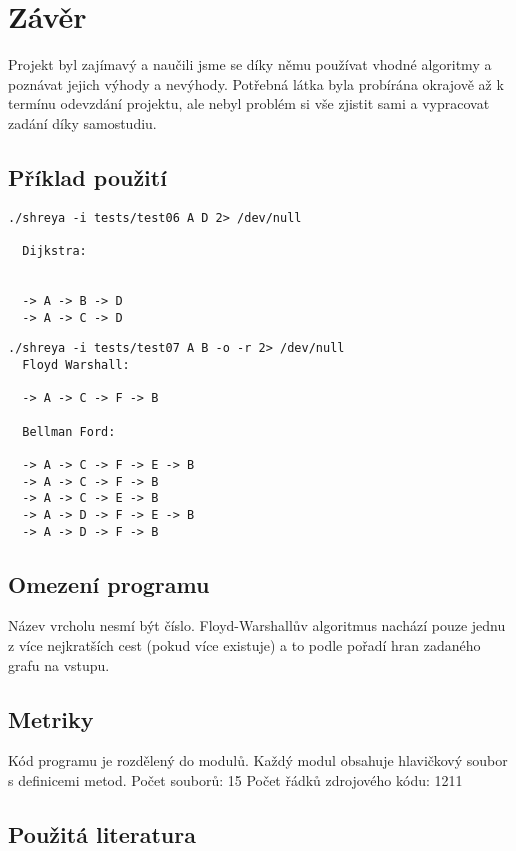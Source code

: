 \documentclass[a4paper,11pt]{article}
\begin{document}
\section{Závěr}
Projekt byl zajímavý a naučili jsme se díky němu používat vhodné algoritmy a poznávat jejich výhody a nevýhody. Potřebná látka byla probírána okrajově až k termínu odevzdání projektu, ale nebyl problém si vše zjistit sami a vypracovat zadání díky samostudiu.

\newpage

\subsection{Příklad použití}

\lstset{language=Bash}
\begin{lstlisting}[frame=single,breaklines]
  ./shreya -i tests/test06 A D 2> /dev/null

  Dijkstra:


  -> A -> B -> D
  -> A -> C -> D

\end{lstlisting}

\lstset{language=Bash}
\begin{lstlisting}[frame=single,breaklines]
  ./shreya -i tests/test07 A B -o -r 2> /dev/null
  Floyd Warshall:

  -> A -> C -> F -> B

  Bellman Ford:

  -> A -> C -> F -> E -> B
  -> A -> C -> F -> B
  -> A -> C -> E -> B
  -> A -> D -> F -> E -> B
  -> A -> D -> F -> B
\end{lstlisting}

\subsection{Omezení programu}
Název vrcholu nesmí být číslo. Floyd-Warshallův algoritmus nachází pouze jednu z více nejkratších cest (pokud více existuje) a to podle pořadí hran zadaného grafu na vstupu.

\subsection{Metriky}

Kód programu je rozdělený do modulů. Každý modul obsahuje hlavičkový soubor s definicemi metod. \newline\newline
Počet souborů: 15 \newline
Počet řádků zdrojového kódu: 1211

\subsection{Použitá literatura}



\nocite{*}




\newpage
\thispagestyle{empty}
\end{document}
